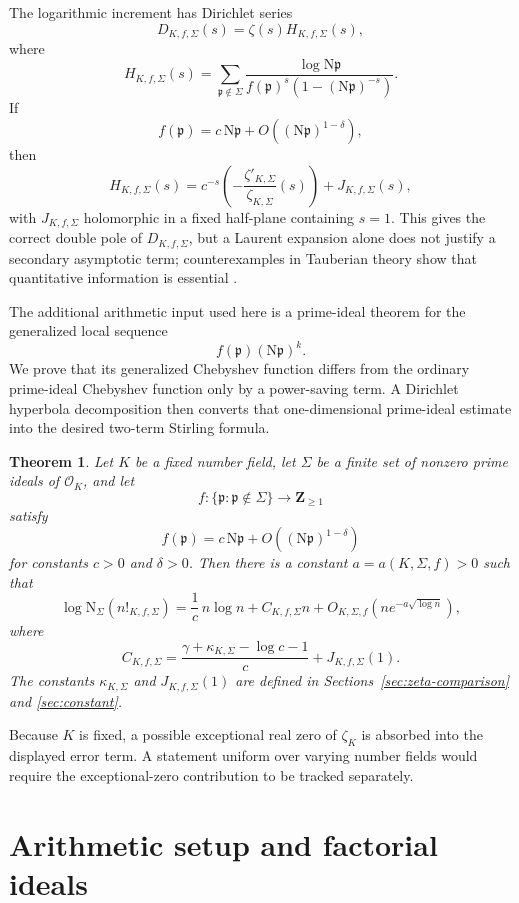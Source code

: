 \documentclass[11pt]{article}
\newtheorem{theorem}{Theorem}[section]
\newcommand{\OK}{\mathcal O_K}
\newcommand{\Norm}{\mathrm N}
\begin{document}
The logarithmic increment has Dirichlet series
\[
D_{K,f,\Sigma}(s)
=
\zeta(s)H_{K,f,\Sigma}(s),
\]
where
\[
H_{K,f,\Sigma}(s)
=
\sum_{\mathfrak p\notin\Sigma}
\frac{\log\Norm\mathfrak p}
{f(\mathfrak p)^s
 (1-(\Norm\mathfrak p)^{-s})}.
\]
If
\[
f(\mathfrak p)
=
c\,\Norm\mathfrak p
+
O\!\left((\Norm\mathfrak p)^{1-\delta}\right),
\]
then
\[
H_{K,f,\Sigma}(s)
=
c^{-s}
\left(
-\frac{\zeta'_{K,\Sigma}}{\zeta_{K,\Sigma}}(s)
\right)
+
J_{K,f,\Sigma}(s),
\]
with \(J_{K,f,\Sigma}\) holomorphic in a fixed half-plane containing
\(s=1\).  This gives the correct double pole of \(D_{K,f,\Sigma}\), but
a Laurent expansion alone does not justify a secondary asymptotic
term; counterexamples in Tauberian theory show that quantitative
information is essential \cite{PierceTauberian}.

The additional arithmetic input used here is a prime-ideal theorem for
the generalized local sequence
\[
f(\mathfrak p)(\Norm\mathfrak p)^k.
\]
We prove that its generalized Chebyshev function differs from the
ordinary prime-ideal Chebyshev function only by a power-saving term.
A Dirichlet hyperbola decomposition then converts that one-dimensional
prime-ideal estimate into the desired two-term Stirling formula.

\begin{theorem}\label{thm:main}
Let \(K\) be a fixed number field, let \(\Sigma\) be a finite set of
nonzero prime ideals of \(\OK\), and let
\[
f:\{\mathfrak p:\mathfrak p\notin\Sigma\}
\longrightarrow \mathbf Z_{\ge 1}
\]
satisfy
\[
f(\mathfrak p)
=
c\,\Norm\mathfrak p
+
O\!\left((\Norm\mathfrak p)^{1-\delta}\right)
\]
for constants \(c>0\) and \(\delta>0\).  Then there is a constant
\(a=a(K,\Sigma,f)>0\) such that
\[
\log\Norm_\Sigma(n!_{K,f,\Sigma})
=
\frac1c\,n\log n
+
C_{K,f,\Sigma}n
+
O_{K,\Sigma,f}\!\left(
n e^{-a\sqrt{\log n}}
\right),
\]
where
\[
C_{K,f,\Sigma}
=
\frac{\gamma+\kappa_{K,\Sigma}-\log c-1}{c}
+
J_{K,f,\Sigma}(1).
\]
The constants \(\kappa_{K,\Sigma}\) and
\(J_{K,f,\Sigma}(1)\) are defined in
Sections~\ref{sec:zeta-comparison} and \ref{sec:constant}.
\end{theorem}

Because \(K\) is fixed, a possible exceptional real zero of
\(\zeta_K\) is absorbed into the displayed error term.  A statement
uniform over varying number fields would require the exceptional-zero
contribution to be tracked separately.

\section{Arithmetic setup and factorial ideals}
\end{document}
